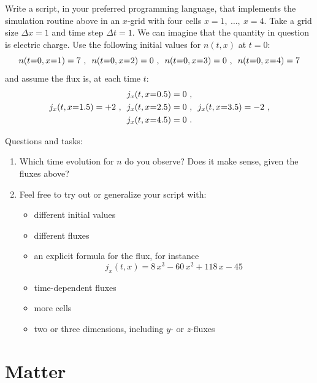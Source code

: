 \documentclass[a4paper,12pt,%
onecolumn,oneside,titlepage,%
british%
]{memoir}
\newcommand*{\incr}{\Delta}%
\renewcommand*{\|}[1][]{\nonscript\:#1\vert\nonscript\:\mathopen{}}
\newcommand*{\mo}[1][=]{\mathclose{}\mathord{\nonscript\mkern0.5mu#1\nonscript\mkern0.5mu}\mathopen{}}
\newcommand*{\Dt}{\incr t}
\newcommand*{\Dx}{\incr x}
\begin{document}
\begin{exercise}
  Write a script, in your preferred programming language, that implements the simulation routine above in an $x$-grid with four cells $x=1,\ \dotsc,\ x=4$. Take a grid size $\Dx=1$ and time step $\Dt=1$. We can imagine that the quantity in question is electric charge. Use the following initial values for $n(t,x)$ at $t=0$:
  \begin{equation*}
    n(t\mo0, x\mo1)=7\ ,\enspace
    n(t\mo0, x\mo2)=0\ ,\enspace
    n(t\mo0, x\mo3)=0\ ,\enspace
    n(t\mo0, x\mo4)=7
  \end{equation*}
  and assume the flux is, at each time $t$:
  \begin{multline*}
      j_{x}(t, x\mo0.5)=0\ ,\\
      j_{x}(t, x\mo1.5)=+2\ ,\enspace
      j_{x}(t, x\mo2.5)=0\ ,\enspace
      j_{x}(t, x\mo3.5)=-2\ ,\\
      j_{x}(t, x\mo4.5)=0 \ .
    \end{multline*}

    Questions and tasks:
    \begin{enumerate}[exerc]
    \item Which time evolution for $n$ do you observe? Does it make sense, given the fluxes above?
    \item Feel free to try out or generalize your script with:
      \begin{itemize}[shift]
      \item different initial values
      \item different fluxes
      \item an explicit formula for the flux, for instance
        \begin{equation*}
          j_{x}(t,x) = 8\,x^{3} - 60\,x^{2} + 118\,x - 45
        \end{equation*}
      \item time-dependent fluxes
      \item more cells
      \item two or three dimensions, including $y$- or $z$-fluxes
      \end{itemize}
    \end{enumerate}

\end{exercise}



\printpagenotes*
\clearpage
\chapter{Matter}
\label{ncha:matter}
\end{document}
